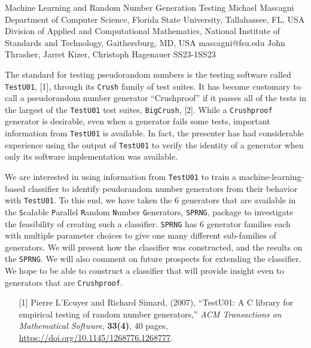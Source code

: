 \begin{talk}
  {Machine Learning and Random Number Generation Testing}%
  {Michael Mascagni}%
  {Department of Computer Science, Florida State University, Tallahassee, FL, USA\\Division of Applied and Computational Mathematics, National Institute of Standards and Technology, Gaithersburg, MD, USA}%
  {mascagni@fsu.edu}%
  {John Thrasher, Jarret Kizer, Christoph Hagenauer}%
{}{}{SS23-1}{SS23}

			
The standard for testing pseudorandom numbers is the testing software called {\tt TestU01}, [1], through its {\tt Crush} family of test suites.  It has become customary to call a pseudorandom number generator ``Crushproof'' if it passes all of the tests in the largest of the {\tt TestU01} test suites, {\tt BigCrush}, [2].  While a {\tt Crushproof}  generator is desirable, even when a generator fails some tests, important information from {\tt TestU01} is available.  In fact, the presenter has had considerable experience using the output of {\tt TestU01} to verify the identity of a generator when only its software implementation was available.

We are interested in using information from {\tt TestU01} to train a machine-learning-based classifier to identify peudorandom number generators from their behavior with {\tt TestU01}.  To this end, we have taken the 6 generators that are available in the {\tt S}calable {\tt P}arallel {\tt R}andom {\tt N}umber {\tt G}enerators, {\tt SPRNG}, package to investigate the feasibility of creating such a classifier.  {\tt SPRNG} has 6 generator families each with multiple parameter choices to give one many different sub-families of generators.  We will present how the classifier was constructed, and the results on the {\tt SPRNG}.  We will also comment on future prospects for extending the classifier.  We hope to be able to construct a classifier that will provide insight even to generators that are {\tt Crushproof}.

\medskip

\begin{enumerate}
\item[{[1]}] Pierre L'Ecuyer and Richard Simard, (2007),
``TestU01: A C library for empirical testing of random number generators,''
{\it ACM Transactions on Mathematical Software}, {\bf 33(4)}, 40 pages, 
\url{https://doi.org/10.1145/1268776.1268777}.


\end{enumerate}
\end{talk}
